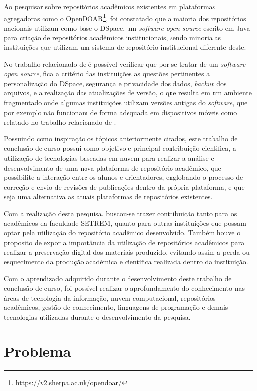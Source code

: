 Ao pesquisar sobre repositórios acadêmicos existentes em plataformas
agregadoras como o OpenDOAR\footnote{https://v2.sherpa.ac.uk/opendoar/},
foi constatado que a maioria dos repositórios nacionais utilizam como
base o DSpace, um \emph{software open source} escrito em Java para
criação de repositórios acadêmicos institucionais,
sendo minoria as instituições que utilizam um sistema de repositório
institucional diferente deste.

No trabalho relacionado de \cite{GarciaRodrigoMoreira2019DdnB} é possível
verificar que por se tratar de um \emph{software open source},
fica a critério das instituições as questões pertinentes a personalização
do DSpace, segurança e privacidade dos dados, \emph{backup} dos arquivos,
e a realização das atualizações de versão, o que resulta em um ambiente
fragmentado onde algumas instituições utilizam versões antigas do \emph{software},
que por exemplo não funcionam de forma adequada em dispositivos móveis como
relatado no trabalho relacionado de \cite{FernandesMacedes:2019}.

Possuindo como inspiração os tópicos anteriormente citados,
este trabalho de conclusão de curso possui como objetivo e principal
contribuição cientifica, a utilização de tecnologias baseadas em
nuvem para realizar a análise e desenvolvimento de uma nova plataforma
de repositório acadêmico, que possibilite a interação entre os alunos
e orientadores, englobando o processo de correção e envio de revisões
de publicações dentro da própria plataforma, e que seja uma alternativa
as atuais plataformas de repositórios existentes.

Com a realização desta pesquisa, buscou-se trazer contribuição
tanto para os acadêmicos da faculdade SETREM, quanto para outras
instituições que possam optar pela utilização do repositório
acadêmico desenvolvido. Também houve o proposito de expor a
importância da utilização de repositórios acadêmicos para realizar
a preservação digital dos materiais produzido, evitando assim a perda
ou esquecimento da produção acadêmica e cientifica realizada dentro
da instituição.

Com o aprendizado adquirido durante o desenvolvimento deste trabalho
de conclusão de curso, foi possível realizar o aprofundamento do
conhecimento nas áreas de tecnologia da informação, nuvem computacional,
repositórios acadêmicos, gestão de conhecimento, linguagens de programação
e demais tecnologias utilizadas durante o desenvolvimento da pesquisa.

\section{Problema} \label{sec::Problem}

